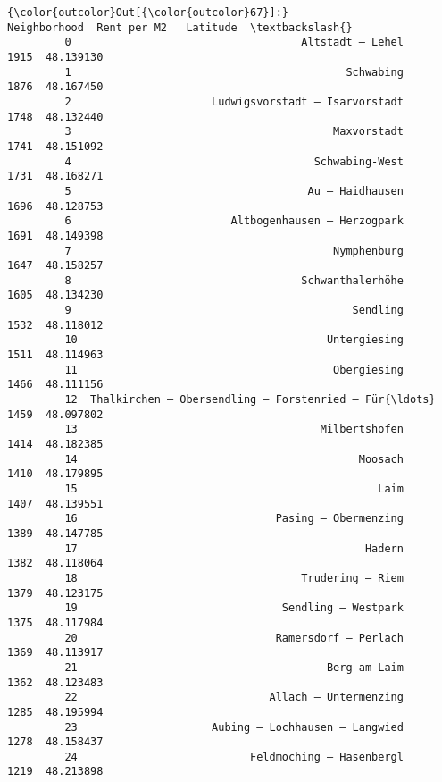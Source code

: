 \documentclass[11pt]{article}
\begin{document}
\begin{Verbatim}[commandchars=\\\{\}]
{\color{outcolor}Out[{\color{outcolor}67}]:}                                          Neighborhood  Rent per M2   Latitude  \textbackslash{}
         0                                    Altstadt – Lehel         1915  48.139130   
         1                                           Schwabing         1876  48.167450   
         2                      Ludwigsvorstadt – Isarvorstadt         1748  48.132440   
         3                                         Maxvorstadt         1741  48.151092   
         4                                      Schwabing-West         1731  48.168271   
         5                                     Au – Haidhausen         1696  48.128753   
         6                         Altbogenhausen – Herzogpark         1691  48.149398   
         7                                         Nymphenburg         1647  48.158257   
         8                                    Schwanthalerhöhe         1605  48.134230   
         9                                            Sendling         1532  48.118012   
         10                                       Untergiesing         1511  48.114963   
         11                                        Obergiesing         1466  48.111156   
         12  Thalkirchen – Obersendling – Forstenried – Für{\ldots}         1459  48.097802   
         13                                      Milbertshofen         1414  48.182385   
         14                                            Moosach         1410  48.179895   
         15                                               Laim         1407  48.139551   
         16                               Pasing – Obermenzing         1389  48.147785   
         17                                             Hadern         1382  48.118064   
         18                                   Trudering – Riem         1379  48.123175   
         19                                Sendling – Westpark         1375  48.117984   
         20                               Ramersdorf – Perlach         1369  48.113917   
         21                                       Berg am Laim         1362  48.123483   
         22                              Allach – Untermenzing         1285  48.195994   
         23                     Aubing – Lochhausen – Langwied         1278  48.158437   
         24                           Feldmoching – Hasenbergl         1219  48.213898   
         

\end{Verbatim}
\end{document}

